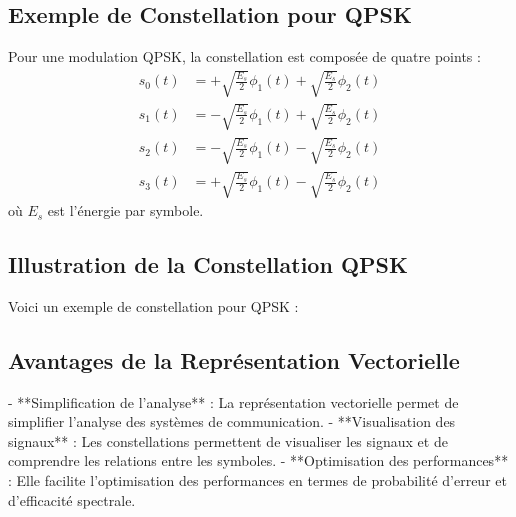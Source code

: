 \documentclass[10pt,a4paper]{article}
\begin{document}
\subsection*{Exemple de Constellation pour QPSK}
Pour une modulation QPSK, la constellation est composée de quatre points :
\[
\begin{aligned}
s_0(t) &= +\sqrt{\frac{E_s}{2}} \phi_1(t) + \sqrt{\frac{E_s}{2}} \phi_2(t) \\
s_1(t) &= -\sqrt{\frac{E_s}{2}} \phi_1(t) + \sqrt{\frac{E_s}{2}} \phi_2(t) \\
s_2(t) &= -\sqrt{\frac{E_s}{2}} \phi_1(t) - \sqrt{\frac{E_s}{2}} \phi_2(t) \\
s_3(t) &= +\sqrt{\frac{E_s}{2}} \phi_1(t) - \sqrt{\frac{E_s}{2}} \phi_2(t)
\end{aligned}
\]
où \(E_s\) est l'énergie par symbole.

\subsection*{Illustration de la Constellation QPSK}
Voici un exemple de constellation pour QPSK :


\subsection*{Avantages de la Représentation Vectorielle}
- **Simplification de l'analyse** : La représentation vectorielle permet de simplifier l'analyse des systèmes de communication.
- **Visualisation des signaux** : Les constellations permettent de visualiser les signaux et de comprendre les relations entre les symboles.
- **Optimisation des performances** : Elle facilite l'optimisation des performances en termes de probabilité d'erreur et d'efficacité spectrale.
\end{document}
